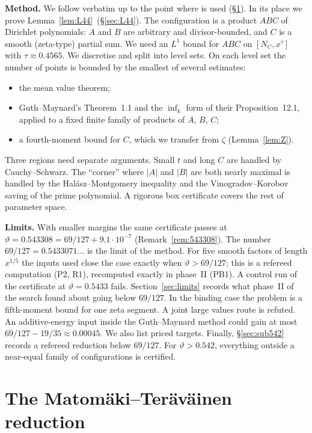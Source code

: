 \documentclass[11pt]{amsart}
\theoremstyle{definition}
\theoremstyle{remark}
\newcommand{\Lfp}{Lemma~\ref{lem:L44}}
\begin{document}
\smallskip
\noindent\textbf{Method.} We follow \cite{MT} verbatim up to the point where \cite[Lemma~4.4]{MT} is used (\S\ref{sec:red}). In its place we prove
\Lfp\ (\S\ref{sec:L44}). The configuration is a product $ABC$ of Dirichlet polynomials: $A$ and $B$ are arbitrary and divisor-bounded,
and $C$ is a smooth (zeta-type) partial sum. We need an $L^1$ bound for $ABC$ on $[N_C,x^{\tau}]$ with $\tau\approx 0.4565$.
We discretise and split into level sets. On each level set the number of points is bounded by the smallest of several estimates:
\begin{itemize}[leftmargin=*]
\item the mean value theorem;
\item Guth--Maynard's Theorem~1.1 and the $\inf_k$ form of their Proposition~12.1, applied to a fixed finite family of products of $A$, $B$, $C$;
\item a fourth-moment bound for $C$, which we transfer from $\zeta$ (Lemma~\ref{lem:Z}).
\end{itemize}
Three regions need separate arguments. Small $t$ and long $C$ are handled by Cauchy--Schwarz. The ``corner'' where $|A|$ and $|B|$ are both nearly maximal is
handled by the Hal\'asz--Montgomery inequality and the Vinogradov--Korobov saving of the prime polynomial. A rigorous box
certificate covers the rest of parameter space.

\smallskip
\noindent\textbf{Limits.} With smaller margins the same certificate passes at $\vartheta=0.543308=69/127+9.1\cdot10^{-7}$
(Remark~\ref{rem:543308}). The number $69/127=0.5433071\ldots$ is the limit of the method. For five smooth factors of length $x^{1/5}$ the
inputs used close the case exactly when $\vartheta>69/127$; this is a refereed computation (P2, R1), recomputed exactly in phase~II (PB1).
A control run of the certificate at $\vartheta=0.5433$ fails. Section~\ref{sec:limits} records what phase~II of the search found about going
below $69/127$. In the binding case the problem is a fifth-moment bound for one zeta segment. A joint large values route is refuted. An
additive-energy input inside the Guth--Maynard method could gain at most $69/127-19/35\approx0.00045$. We also list priced targets.
Finally, \S\ref{sec:sub542} records a refereed reduction below $69/127$. For $\vartheta>0.542$, everything outside a near-equal family of
configurations is certified.

\section{The Matom\"aki--Ter\"av\"ainen reduction}\label{sec:red}
\end{document}
